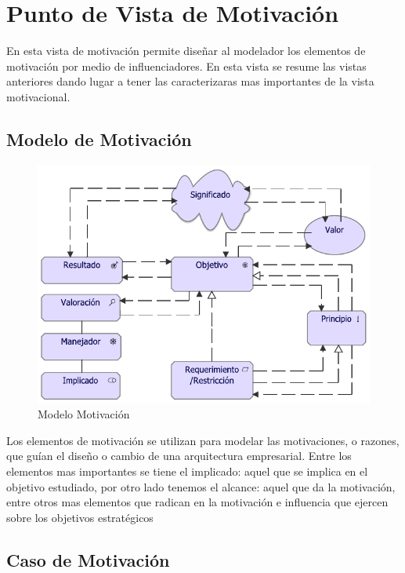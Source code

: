 \section{Punto de Vista de Motivación}
En esta vista de motivación permite diseñar al modelador los elementos de motivación por medio de influenciadores. En esta vista se resume las vistas anteriores dando lugar a tener las caracterizaras mas importantes de la vista motivacional.

\subsection{Modelo de Motivación}
\begin{figure}[h!]
	\centering
	\includegraphics[width=1.0\linewidth]{imgs/modelo/Motivacion}
	\caption{Modelo Motivación}
\end{figure}

Los elementos de motivación se utilizan para modelar las motivaciones, o razones, que guían el diseño o cambio de una arquitectura empresarial. Entre los elementos mas importantes se tiene el implicado: aquel que se implica en el objetivo estudiado, por otro lado tenemos el alcance: aquel que da la motivación, entre otros mas elementos que radican en la motivación e influencia que ejercen sobre los objetivos estratégicos

\clearpage
\subsection{Caso  de Motivación}

